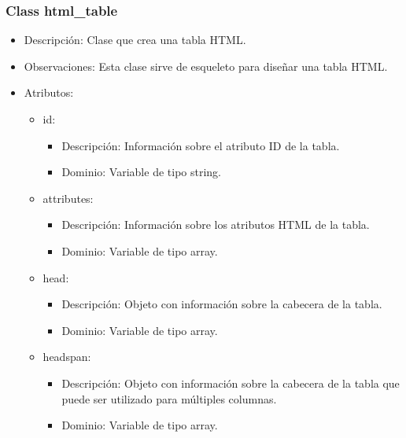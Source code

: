 \subsubsection{Class html\_table}

\begin{itemize}
	\item Descripción: Clase que crea una tabla HTML.
	\item Observaciones: Esta clase sirve de esqueleto para diseñar una tabla HTML.
	\item Atributos:
		\begin{itemize}
			\item id:
				\begin{itemize}
					\item Descripción: Información sobre el atributo ID de la tabla.
					\item Dominio: Variable de tipo string.
				\end{itemize}
		\end{itemize}
		\begin{itemize}
			\item attributes:
				\begin{itemize}
					\item Descripción: Información sobre los atributos HTML de la tabla.
					\item Dominio: Variable de tipo array.
				\end{itemize}
		\end{itemize}
		\begin{itemize}
			\item head:
				\begin{itemize}
					\item Descripción: Objeto con información sobre la cabecera de la tabla.
					\item Dominio: Variable de tipo array.
				\end{itemize}
		\end{itemize}
		\begin{itemize}
			\item headspan:
				\begin{itemize}
					\item Descripción: Objeto con información sobre la cabecera de la tabla que puede ser utilizado para múltiples columnas.
					\item Dominio: Variable de tipo array.
				\end{itemize}
		\end{itemize}
		\begin{itemize}

\end{itemize}
\end{itemize}
